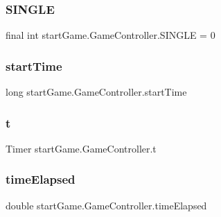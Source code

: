 \subsubsection{\texorpdfstring{S\+I\+N\+G\+LE}{SINGLE}}
{\footnotesize\ttfamily final int start\+Game.\+Game\+Controller.\+S\+I\+N\+G\+LE = 0\hspace{0.3cm}{\ttfamily [private]}}

\hypertarget{classstart_game_1_1_game_controller_ae22325815bc07ca189abe8e41c94995d}{}\label{classstart_game_1_1_game_controller_ae22325815bc07ca189abe8e41c94995d} 
\subsubsection{\texorpdfstring{start\+Time}{startTime}}
{\footnotesize\ttfamily long start\+Game.\+Game\+Controller.\+start\+Time\hspace{0.3cm}{\ttfamily [private]}}

\hypertarget{classstart_game_1_1_game_controller_af1da0eb8171f6098d28786c5c957fcfd}{}\label{classstart_game_1_1_game_controller_af1da0eb8171f6098d28786c5c957fcfd} 
\subsubsection{\texorpdfstring{t}{t}}
{\footnotesize\ttfamily Timer start\+Game.\+Game\+Controller.\+t\hspace{0.3cm}{\ttfamily [private]}}

\hypertarget{classstart_game_1_1_game_controller_aa63c2f38740966c67d19de8cd4a2a9d0}{}\label{classstart_game_1_1_game_controller_aa63c2f38740966c67d19de8cd4a2a9d0} 
\subsubsection{\texorpdfstring{time\+Elapsed}{timeElapsed}}
{\footnotesize\ttfamily double start\+Game.\+Game\+Controller.\+time\+Elapsed\hspace{0.3cm}{\ttfamily [private]}}


